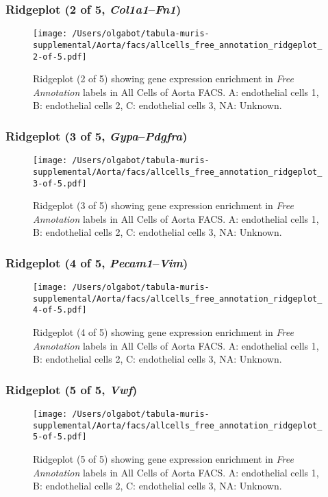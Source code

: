 \clearpage

\subsubsection{Ridgeplot (2 of 5, \emph{Col1a1}--\emph{Fn1})}
\begin{figure}[h]
\centering
\texttt{[image: /Users/olgabot/tabula-muris-supplemental/Aorta/facs/allcells\_free\_annotation\_ridgeplot\_2-of-5.pdf]}

\caption{ Ridgeplot (2 of 5)  showing gene expression enrichment in \emph{Free Annotation} labels in All Cells of Aorta FACS. A: endothelial cells 1, B: endothelial cells 2, C: endothelial cells 3, NA: Unknown.}
\end{figure}


\clearpage

\subsubsection{Ridgeplot (3 of 5, \emph{Gypa}--\emph{Pdgfra})}
\begin{figure}[h]
\centering
\texttt{[image: /Users/olgabot/tabula-muris-supplemental/Aorta/facs/allcells\_free\_annotation\_ridgeplot\_3-of-5.pdf]}

\caption{ Ridgeplot (3 of 5)  showing gene expression enrichment in \emph{Free Annotation} labels in All Cells of Aorta FACS. A: endothelial cells 1, B: endothelial cells 2, C: endothelial cells 3, NA: Unknown.}
\end{figure}


\clearpage

\subsubsection{Ridgeplot (4 of 5, \emph{Pecam1}--\emph{Vim})}
\begin{figure}[h]
\centering
\texttt{[image: /Users/olgabot/tabula-muris-supplemental/Aorta/facs/allcells\_free\_annotation\_ridgeplot\_4-of-5.pdf]}

\caption{ Ridgeplot (4 of 5)  showing gene expression enrichment in \emph{Free Annotation} labels in All Cells of Aorta FACS. A: endothelial cells 1, B: endothelial cells 2, C: endothelial cells 3, NA: Unknown.}
\end{figure}


\clearpage

\subsubsection{Ridgeplot (5 of 5, \emph{Vwf})}
\begin{figure}[h]
\centering
\texttt{[image: /Users/olgabot/tabula-muris-supplemental/Aorta/facs/allcells\_free\_annotation\_ridgeplot\_5-of-5.pdf]}

\caption{ Ridgeplot (5 of 5)  showing gene expression enrichment in \emph{Free Annotation} labels in All Cells of Aorta FACS. A: endothelial cells 1, B: endothelial cells 2, C: endothelial cells 3, NA: Unknown.}
\end{figure}


